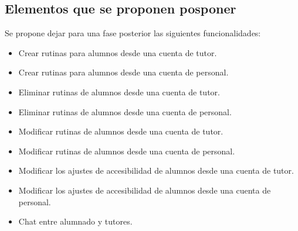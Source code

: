 \subsection{Elementos que se proponen posponer}
Se propone dejar para una fase posterior las siguientes funcionalidades:
\begin{itemize}[leftmargin=*]
  \item Crear rutinas para alumnos desde una cuenta de tutor.
  \item Crear rutinas para alumnos desde una cuenta de personal.
  \item Eliminar rutinas de alumnos desde una cuenta de tutor.
  \item Eliminar rutinas de alumnos desde una cuenta de personal.
  \item Modificar rutinas de alumnos desde una cuenta de tutor.
  \item Modificar rutinas de alumnos desde una cuenta de personal.
  \item Modificar los ajustes de accesibilidad de alumnos desde una cuenta de tutor.
  \item Modificar los ajustes de accesibilidad de alumnos desde una cuenta de personal.
  \item Chat entre alumnado y tutores.
\end{itemize}

